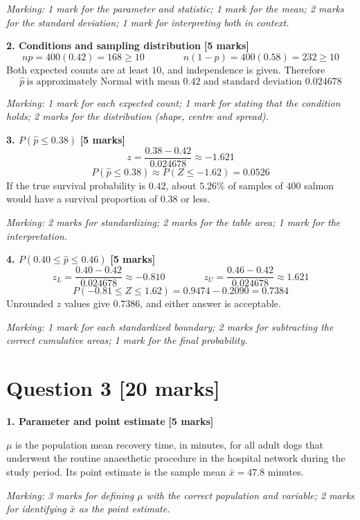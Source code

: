 \documentclass[10pt,letterpaper]{article}
\newcommand{\partmarks}[1]{\hfill\textbf{[#1 marks]}}
\newcommand{\allocation}[1]{\par\smallskip\textit{Marking: #1}\par}
\begin{document}
\allocation{1 mark for the parameter and statistic; 1 mark for the mean; 2 marks for the standard deviation; 1 mark for interpreting both in context.}

\textbf{2. Conditions and sampling distribution} \partmarks{5}
$$np=400(0.42)=168\ge10 \qquad\qquad n(1-p)=400(0.58)=232\ge10$$
Both expected counts are at least $10$, and independence is given. Therefore
$$\hat p\ \text{is approximately Normal with mean } 0.42 \text{ and standard deviation } 0.024678$$

\allocation{1 mark for each expected count; 1 mark for stating that the condition holds; 2 marks for the distribution (shape, centre and spread).}

\textbf{3. $P(\hat p\le0.38)$} \partmarks{5}
$$z=\frac{0.38-0.42}{0.024678}\approx-1.621$$
$$P(\hat p\le0.38)\approx P(Z\le-1.62)=\boxed{0.0526}$$
If the true survival probability is $0.42$, about $5.26\%$ of samples of $400$ salmon would have a survival proportion of $0.38$ or less.

\allocation{2 marks for standardizing; 2 marks for the table area; 1 mark for the interpretation.}

\textbf{4. $P(0.40\le\hat p\le0.46)$} \partmarks{5}
$$z_L=\frac{0.40-0.42}{0.024678}\approx-0.810 \qquad\qquad z_U=\frac{0.46-0.42}{0.024678}\approx1.621$$
$$P(-0.81\le Z\le1.62)=0.9474-0.2090=\boxed{0.7384}$$
Unrounded $z$ values give $0.7386$, and either answer is acceptable.

\allocation{1 mark for each standardized boundary; 2 marks for subtracting the correct cumulative areas; 1 mark for the final probability.}

\newpage
\section*{Question 3 \hfill [20 marks]}

\textbf{1. Parameter and point estimate} \partmarks{5}

$\mu$ is the population mean recovery time, in minutes, for all adult dogs that underwent the routine anaesthetic procedure in the hospital network during the study period. Its point estimate is the sample mean $\bar x=47.8$ minutes.

\allocation{3 marks for defining $\mu$ with the correct population and variable; 2 marks for identifying $\bar x$ as the point estimate.}
\end{document}
